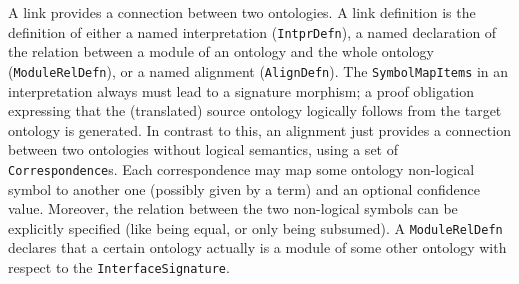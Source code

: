 \documentclass[%
\ifpretendfinal
final%
\else
draft%
\fi,
a4paper,
wd]{isov2}
\newcommand*{\syntax}[1]{\texttt{#1}}
\begin{document}
A link provides a connection between two ontologies.
A link definition is the definition of either a named interpretation
(\syntax{IntprDefn}), a named declaration of the relation between a module of an ontology and the whole ontology (\syntax{ModuleRelDefn}), or a named alignment (\syntax{AlignDefn}).
The \syntax{SymbolMapItems} in an interpretation always
must lead to a signature morphism; a proof obligation expressing
that the (translated) source ontology logically follows from
the target ontology is generated. In contrast to this,
an alignment just provides a connection between two ontologies
without logical semantics, using a set of \syntax{Correspondence}s.
Each correspondence may map some ontology non-logical symbol to another one
(possibly given by a term) and an optional confidence value.
Moreover, the relation between the two non-logical symbols can be explicitly
specified (like being equal, or only being subsumed). 
A \syntax{ModuleRelDefn} declares that a certain ontology
actually is a module of some other ontology with respect
to the \syntax{InterfaceSignature}.
\end{document}
